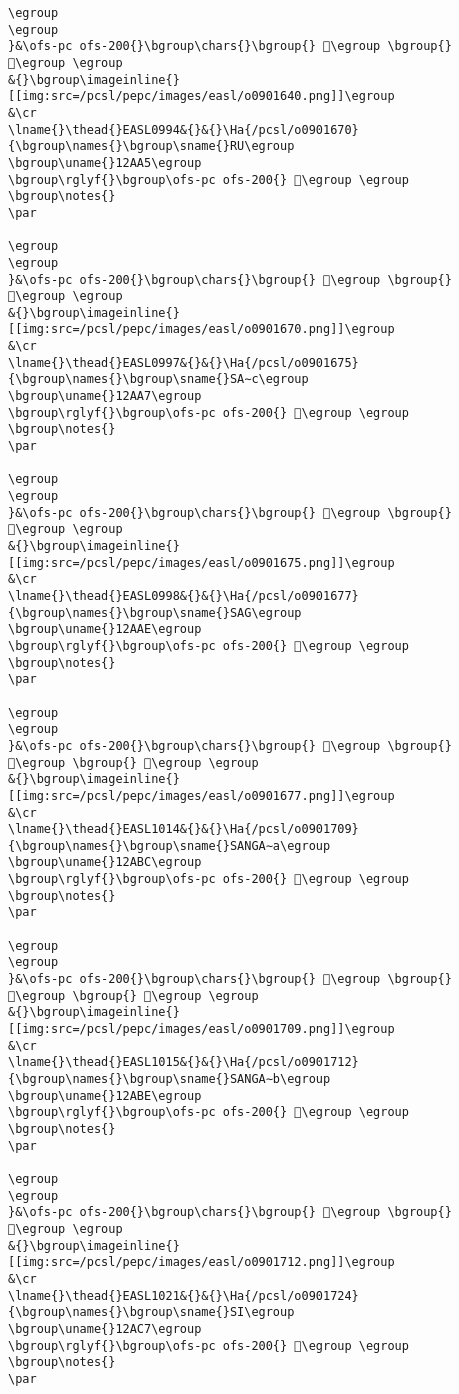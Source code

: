 \begin{verbatim}
\egroup
\egroup
}&\ofs-pc ofs-200{}\bgroup\chars{}\bgroup{} 𒪓\egroup \bgroup{} 𒪔\egroup \egroup
&{}\bgroup\imageinline{}[[img:src=/pcsl/pepc/images/easl/o0901640.png]]\egroup
&\cr
\lname{}\thead{}EASL0994&{}&{}\Ha{/pcsl/o0901670}{\bgroup\names{}\bgroup\sname{}RU\egroup
\bgroup\uname{}12AA5\egroup
\bgroup\rglyf{}\bgroup\ofs-pc ofs-200{} 𒪥\egroup \egroup
\bgroup\notes{}
\par 

\egroup
\egroup
}&\ofs-pc ofs-200{}\bgroup\chars{}\bgroup{} 𒪣\egroup \bgroup{} 𒪥\egroup \egroup
&{}\bgroup\imageinline{}[[img:src=/pcsl/pepc/images/easl/o0901670.png]]\egroup
&\cr
\lname{}\thead{}EASL0997&{}&{}\Ha{/pcsl/o0901675}{\bgroup\names{}\bgroup\sname{}SA∼c\egroup
\bgroup\uname{}12AA7\egroup
\bgroup\rglyf{}\bgroup\ofs-pc ofs-200{} 𒪧\egroup \egroup
\bgroup\notes{}
\par 

\egroup
\egroup
}&\ofs-pc ofs-200{}\bgroup\chars{}\bgroup{} 𒪧\egroup \bgroup{} 𒪨\egroup \egroup
&{}\bgroup\imageinline{}[[img:src=/pcsl/pepc/images/easl/o0901675.png]]\egroup
&\cr
\lname{}\thead{}EASL0998&{}&{}\Ha{/pcsl/o0901677}{\bgroup\names{}\bgroup\sname{}SAG\egroup
\bgroup\uname{}12AAE\egroup
\bgroup\rglyf{}\bgroup\ofs-pc ofs-200{} 𒪮\egroup \egroup
\bgroup\notes{}
\par 

\egroup
\egroup
}&\ofs-pc ofs-200{}\bgroup\chars{}\bgroup{} 𒪩\egroup \bgroup{} 𒪮\egroup \bgroup{} 𒪲\egroup \egroup
&{}\bgroup\imageinline{}[[img:src=/pcsl/pepc/images/easl/o0901677.png]]\egroup
&\cr
\lname{}\thead{}EASL1014&{}&{}\Ha{/pcsl/o0901709}{\bgroup\names{}\bgroup\sname{}SANGA∼a\egroup
\bgroup\uname{}12ABC\egroup
\bgroup\rglyf{}\bgroup\ofs-pc ofs-200{} 𒪼\egroup \egroup
\bgroup\notes{}
\par 

\egroup
\egroup
}&\ofs-pc ofs-200{}\bgroup\chars{}\bgroup{} 𒪺\egroup \bgroup{} 𒪻\egroup \bgroup{} 𒪼\egroup \egroup
&{}\bgroup\imageinline{}[[img:src=/pcsl/pepc/images/easl/o0901709.png]]\egroup
&\cr
\lname{}\thead{}EASL1015&{}&{}\Ha{/pcsl/o0901712}{\bgroup\names{}\bgroup\sname{}SANGA∼b\egroup
\bgroup\uname{}12ABE\egroup
\bgroup\rglyf{}\bgroup\ofs-pc ofs-200{} 𒪾\egroup \egroup
\bgroup\notes{}
\par 

\egroup
\egroup
}&\ofs-pc ofs-200{}\bgroup\chars{}\bgroup{} 𒪽\egroup \bgroup{} 𒪾\egroup \egroup
&{}\bgroup\imageinline{}[[img:src=/pcsl/pepc/images/easl/o0901712.png]]\egroup
&\cr
\lname{}\thead{}EASL1021&{}&{}\Ha{/pcsl/o0901724}{\bgroup\names{}\bgroup\sname{}SI\egroup
\bgroup\uname{}12AC7\egroup
\bgroup\rglyf{}\bgroup\ofs-pc ofs-200{} 𒫇\egroup \egroup
\bgroup\notes{}
\par 


\end{verbatim}
